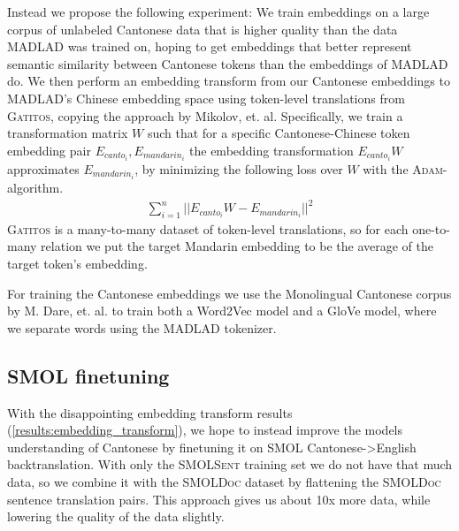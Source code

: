 Instead we propose the following experiment: We train embeddings on a large corpus of unlabeled Cantonese data that is higher quality than the data MADLAD was trained on, hoping to get embeddings that better represent semantic similarity between Cantonese tokens than the embeddings of MADLAD do. We then perform an embedding transform from our Cantonese embeddings to MADLAD's Chinese embedding space using token-level translations from \textsc{Gatitos}, copying the approach by Mikolov, et. al\cite{mikolov2013exploitingsimilaritieslanguagesmachine}. Specifically, we train a transformation matrix $W$ such that for a specific Cantonese-Chinese token embedding pair $E_{{canto}_i}, E_{{mandarin}_i}$ the embedding transformation $E_{{canto}_i} W$ approximates $E_{{mandarin}_i}$, by minimizing the following loss over $W$ with the \textsc{Adam}-algorithm\cite{kingma2017adammethodstochasticoptimization}.
\begin{align*}
    \sum_{i=1}^n  || E_{{canto}_i} W - E_{{mandarin}_i}||^2
\end{align*}
\textsc{Gatitos} is a many-to-many dataset of token-level translations, so for each one-to-many relation we put the target Mandarin embedding to be the average of the target token's embedding.

For training the Cantonese embeddings we use the Monolingual Cantonese corpus by M. Dare, et. al. to train both a Word2Vec\cite{mikolov2013efficientestimationwordrepresentations} model and a GloVe\cite{pennington2014glove} model, where we separate words using the MADLAD tokenizer.

\subsection{\textsc{SMOL} finetuning}
With the disappointing embedding transform results (\ref{results:embedding_transform}), we hope to instead improve the models understanding of Cantonese by finetuning it on \textsc{SMOL} Cantonese->English backtranslation. With only the \textsc{SMOLSent} training set we do not have that much data, so we combine it with the \textsc{SMOLDoc} dataset by flattening the \textsc{SMOLDoc} sentence translation pairs. This approach gives us about 10x more data, while lowering the quality of the data slightly.